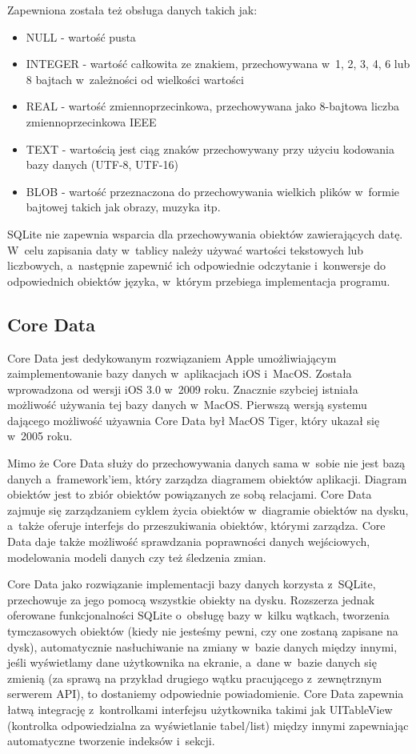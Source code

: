Zapewniona została też obsługa danych takich jak: 

\begin{itemize}
	\item NULL - wartość pusta
	\item INTEGER - wartość całkowita ze znakiem, przechowywana w~1, 2, 3, 4, 6 lub 8 bajtach w~zależności od wielkości wartości
	\item REAL - wartość zmiennoprzecinkowa, przechowywana jako 8-bajtowa liczba zmiennoprzecinkowa IEEE
	\item TEXT - wartością jest ciąg znaków przechowywany przy użyciu kodowania bazy danych (UTF-8, UTF-16)
	\item BLOB - wartość przeznaczona do przechowywania wielkich plików w~formie bajtowej takich jak obrazy, muzyka itp. 
\end{itemize}

SQLite nie zapewnia wsparcia dla przechowywania obiektów zawierających datę. W~celu zapisania daty w~tablicy należy używać wartości tekstowych lub liczbowych, a~następnie zapewnić ich odpowiednie odczytanie i~konwersje do odpowiednich obiektów języka, w~którym przebiega implementacja programu. 

\subsection{Core Data}

Core Data jest dedykowanym rozwiązaniem Apple umożliwiającym zaimplementowanie bazy danych w~aplikacjach iOS i~MacOS. Została wprowadzona od wersji iOS 3.0 w~2009 roku. Znacznie szybciej istniała możliwość używania tej bazy danych w~MacOS. Pierwszą wersją systemu dającego możliwość użyawnia Core Data był MacOS Tiger, który ukazał się w~2005 roku\cite{CoreData-doc}.\par

Mimo że Core Data służy do przechowywania danych sama w~sobie nie jest bazą danych a~framework'iem, który zarządza diagramem obiektów aplikacji. Diagram obiektów jest to zbiór obiektów powiązanych ze sobą relacjami. Core Data zajmuje się zarządzaniem cyklem życia obiektów w~diagramie obiektów na dysku, a~także oferuje interfejs do przeszukiwania obiektów, którymi zarządza. Core Data daje także możliwość sprawdzania poprawności danych wejściowych, modelowania modeli danych czy też śledzenia zmian. \par

Core Data jako rozwiązanie implementacji bazy danych korzysta z~SQLite, przechowuje za jego pomocą wszystkie obiekty na dysku. Rozszerza jednak oferowane funkcjonalności SQLite o~obsługę bazy w~kilku wątkach, tworzenia tymczasowych obiektów (kiedy nie jesteśmy pewni, czy one zostaną zapisane na dysk), automatycznie nasłuchiwanie na zmiany w~bazie danych między innymi, jeśli wyświetlamy dane użytkownika na ekranie, a~dane w~bazie danych się zmienią (za sprawą na przykład drugiego wątku pracującego z~zewnętrznym serwerem API), to dostaniemy odpowiednie powiadomienie. Core Data zapewnia łatwą integrację z~kontrolkami interfejsu użytkownika takimi jak UITableView (kontrolka odpowiedzialna za wyświetlanie tabel/list) między innymi zapewniając automatyczne tworzenie indeksów i~sekcji.\par

